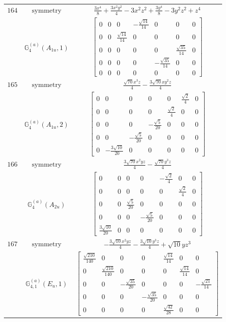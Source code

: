 \documentclass[fleqn,8pt,landscape]{jsarticle}
\begin{document}
\begin{longtable}{ccc}
$ 164 $ & $ \text{symmetry} $ & $ \frac{3 x^{4}}{8} + \frac{3 x^{2} y^{2}}{4} - 3 x^{2} z^{2} + \frac{3 y^{4}}{8} - 3 y^{2} z^{2} + z^{4} $ \\
$  $ & $ \mathbb{G}_{4}^{(a)}(A_{1u},1) $ & $ \begin{bmatrix} 0 & 0 & 0 & - \frac{\sqrt{14}}{14} & 0 & 0 & 0 \\ 0 & 0 & \frac{\sqrt{14}}{14} & 0 & 0 & 0 & 0 \\ 0 & 0 & 0 & 0 & 0 & \frac{\sqrt{35}}{14} & 0 \\ 0 & 0 & 0 & 0 & - \frac{\sqrt{35}}{14} & 0 & 0 \\ 0 & 0 & 0 & 0 & 0 & 0 & 0 \end{bmatrix} $ \\ \hline
$ 165 $ & $ \text{symmetry} $ & $ \frac{\sqrt{70} x^{3} z}{4} - \frac{3 \sqrt{70} x y^{2} z}{4} $ \\
$  $ & $ \mathbb{G}_{4}^{(a)}(A_{1u},2) $ & $ \begin{bmatrix} 0 & 0 & 0 & 0 & 0 & \frac{\sqrt{2}}{4} & 0 \\ 0 & 0 & 0 & 0 & \frac{\sqrt{2}}{4} & 0 & 0 \\ 0 & 0 & 0 & - \frac{\sqrt{5}}{20} & 0 & 0 & 0 \\ 0 & 0 & - \frac{\sqrt{5}}{20} & 0 & 0 & 0 & 0 \\ 0 & - \frac{3 \sqrt{10}}{20} & 0 & 0 & 0 & 0 & 0 \end{bmatrix} $ \\ \hline
$ 166 $ & $ \text{symmetry} $ & $ \frac{3 \sqrt{70} x^{2} y z}{4} - \frac{\sqrt{70} y^{3} z}{4} $ \\
$  $ & $ \mathbb{G}_{4}^{(a)}(A_{2u}) $ & $ \begin{bmatrix} 0 & 0 & 0 & 0 & - \frac{\sqrt{2}}{4} & 0 & 0 \\ 0 & 0 & 0 & 0 & 0 & \frac{\sqrt{2}}{4} & 0 \\ 0 & 0 & \frac{\sqrt{5}}{20} & 0 & 0 & 0 & 0 \\ 0 & 0 & 0 & - \frac{\sqrt{5}}{20} & 0 & 0 & 0 \\ \frac{3 \sqrt{10}}{20} & 0 & 0 & 0 & 0 & 0 & 0 \end{bmatrix} $ \\ \hline
$ 167 $ & $ \text{symmetry} $ & $ - \frac{3 \sqrt{10} x^{2} y z}{4} - \frac{3 \sqrt{10} y^{3} z}{4} + \sqrt{10} y z^{3} $ \\
$  $ & $ \mathbb{G}_{4,1}^{(a)}(E_{u},1) $ & $ \begin{bmatrix} \frac{\sqrt{210}}{140} & 0 & 0 & 0 & \frac{\sqrt{14}}{14} & 0 & 0 \\ 0 & \frac{\sqrt{210}}{140} & 0 & 0 & 0 & \frac{\sqrt{14}}{14} & 0 \\ 0 & 0 & - \frac{\sqrt{35}}{20} & 0 & 0 & 0 & - \frac{\sqrt{21}}{14} \\ 0 & 0 & 0 & - \frac{\sqrt{35}}{20} & 0 & 0 & 0 \\ 0 & 0 & 0 & 0 & \frac{\sqrt{42}}{28} & 0 & 0 \end{bmatrix} $ \\ \hline

\end{longtable}
\end{document}

